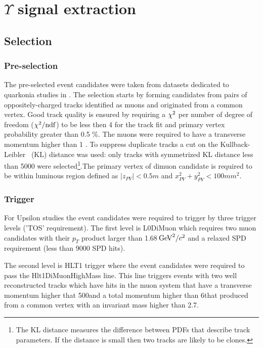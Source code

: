 \section{\texorpdfstring{$\Upsilon$}{Y} signal extraction}
\label{sec:upsilon}

\subsection{Selection}
\label{sec:ups:selelection}
\subsubsection{Pre-selection}
\label{sec:upsilon:selelection:preselection}
The pre-selected event candidates were taken from datasets dedicated to
quarkonia studies in \lhcb. The selection starts by forming candidates from
pairs of oppositely-charged tracks identified as muons and originated from a
common vertex. Good track quality is ensured by requiring a $\chi^2$ per number
of degree of freedom ($\chi^2/\rm{ndf}$) to be less then 4 for the track fit
and primary vertex probability greater than 0.5 \%. The muons were required to
have a transverse momentum higher than 1 \gevc. To suppress duplicate tracks a
cut on the Kullback-Leibler~\cite{Needham:1082460} (KL) distance was used: only
tracks with symmetrized KL distance less than 5000 were selected\footnote{The
KL distance measures the difference between PDFs that describe track
parameters. If the distance is small then two tracks are likely to be
clones.}.The primary vertex of dimuon candidate is required to be within
luminous region defined as $|z_{PV}| < 0.5 m$ and $x_{PV}^2 + y_{PV}^2 < 100
mm^2$.
\subsubsection{Trigger}
\label{sec:upsilon:selection:trigger}

For Upsilon studies the event candidates  were required to trigger by three
trigger levels ('TOS' requirement). The first level is L0DiMuon which  requires
two muon candidates with their $p_T$ product larger than 1.68$\mathrm{\,Ge\kern -0.1em V}^2/c^2$ and
a relaxed SPD requirement (less than 9000 SPD hits).

The second level is HLT1 trigger where the event candidates were required to
pass the Hlt1DiMuonHighMass line.
This line triggers events with  two well reconstructed tracks  which have hits
in the muon system  that have a transverse momentum higher that 500\mevc and 
a total momentum higher than 6\gevc that produced from a common vertex with
an invariant mass higher than 2.7\gevcc.

